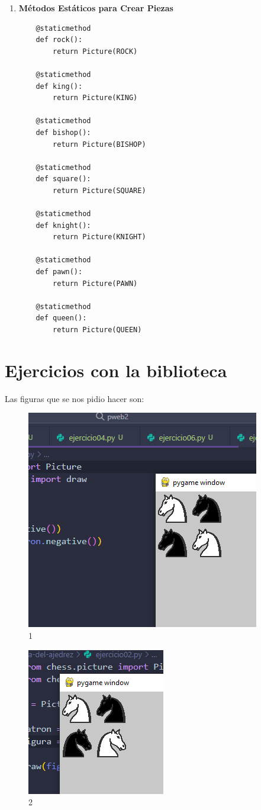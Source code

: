 \begin{enumerate}
    \item \textbf{Métodos Estáticos para Crear Piezas}
    \begin{lstlisting}
    @staticmethod
    def rock():
        return Picture(ROCK)

    @staticmethod
    def king():
        return Picture(KING)

    @staticmethod
    def bishop():
        return Picture(BISHOP)

    @staticmethod
    def square():
        return Picture(SQUARE)

    @staticmethod
    def knight():
        return Picture(KNIGHT)

    @staticmethod
    def pawn():
        return Picture(PAWN)

    @staticmethod
    def queen():
        return Picture(QUEEN)
    \end{lstlisting}
\end{enumerate}

\section{Ejercicios con la biblioteca}
Las figuras que se nos pidio hacer son:

\begin{figure}
    \centering
    \includegraphics[width=0.5\linewidth]{1.png}
    \caption{1}
    \label{fig:enter-label}
\end{figure}

\begin{figure}
    \centering
    \includegraphics[width=0.5\linewidth]{2.png}
    \caption{2}
    \label{fig:enter-label}
\end{figure}

